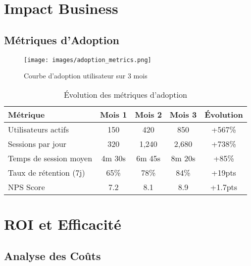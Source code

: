 \section{Impact Business}

\subsection{Métriques d'Adoption}

\begin{figure}[H]
    \centering
    \texttt{[image: images/adoption\_metrics.png]}
    \caption{Courbe d'adoption utilisateur sur 3 mois}
    \label{fig:adoption_metrics}
\end{figure}

\begin{table}[H]
    \centering
    \begin{tabularx}{\textwidth}{|l|c|c|c|c|}
        \hline
        \textbf{Métrique} & \textbf{Mois 1} & \textbf{Mois 2} & \textbf{Mois 3} & \textbf{Évolution} \\
        \hline
        Utilisateurs actifs & 150 & 420 & 850 & +567\% \\
        \hline
        Sessions par jour & 320 & 1,240 & 2,680 & +738\% \\
        \hline
        Temps de session moyen & 4m 30s & 6m 45s & 8m 20s & +85\% \\
        \hline
        Taux de rétention (7j) & 65\% & 78\% & 84\% & +19pts \\
        \hline
        NPS Score & 7.2 & 8.1 & 8.9 & +1.7pts \\
        \hline
    \end{tabularx}
    \caption{Évolution des métriques d'adoption}
    \label{tab:adoption_evolution}
\end{table}

\section{ROI et Efficacité}

\subsection{Analyse des Coûts}

